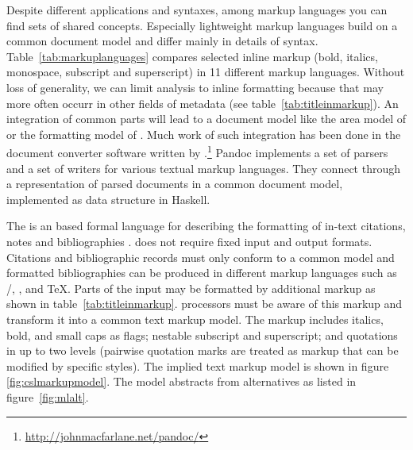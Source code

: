 Despite different applications and syntaxes, among markup languages you can
find sets of shared concepts. Especially lightweight markup languages build
on a common document model and differ mainly in details of syntax.
Table~\ref{tab:markuplanguages} compares selected inline markup (bold,
italics, monospace, subscript and superscript) in 11 different markup
languages. Without loss of generality, we can limit analysis to inline
formatting because that may more often occurr in other fields of metadata
(see table~\ref{tab:titleinmarkup}). An integration of common parts will 
lead to a document model like the area model of  or the 
formatting model of . Much work of such integration has been done
in the  document converter software written by
.\footnote{\url{http://johnmacfarlane.net/pandoc/}}
Pandoc implements a set of parsers and a set of writers for various textual
markup languages. They connect through a representation of parsed documents
in a common document model, implemented as data structure in Haskell.

The  is an  based formal 
language for describing the formatting of in-text citations, notes and 
bibliographies \cite{Zelle2012}.  does not require fixed input and
output formats. Citations and bibliographic records must only conform to a
common model and formatted bibliographies can be produced in different markup 
languages such as  /, , and \TeX. Parts of 
the input may be  formatted by additional markup as shown in
table~\ref{tab:titleinmarkup}.  processors must be aware of this
markup and transform it into a common text markup model. The markup includes 
italics, bold, and small caps as flags; nestable subscript and superscript;
and quotations in up to two levels (pairwise quotation marks are treated 
as markup that can be modified by specific  styles). The implied
text markup model is shown in figure \ref{fig:cslmarkupmodel}. The model
abstracts from alternatives as listed in figure~\ref{fig:mlalt}.


